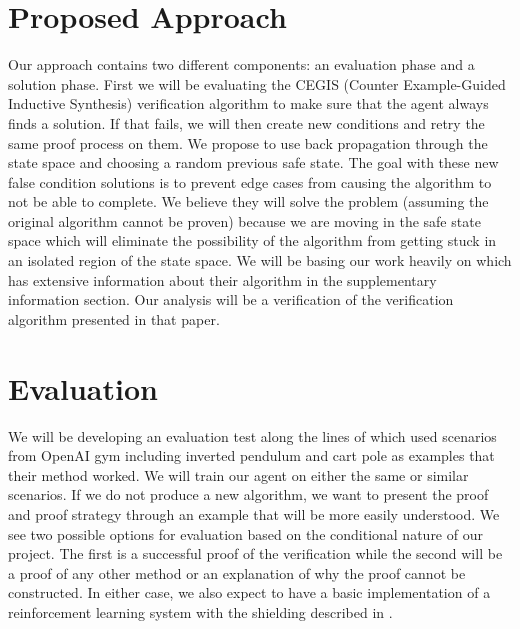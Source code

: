 \documentclass[11pt]{article}
\begin{document}

\section{Proposed Approach}
Our approach contains two different components: an evaluation phase and a solution phase. First we will be evaluating the CEGIS (Counter Example-Guided Inductive Synthesis) verification algorithm to make sure that the agent always finds a solution. If that fails, we will then create new conditions and retry the same proof process on them. We propose to use back propagation through the state space and choosing a random previous safe state. The goal with these new false condition solutions is to prevent edge cases from causing the algorithm to not be able to complete. We believe they will solve the problem (assuming the original algorithm cannot be proven) because we are moving in the safe state space which will eliminate the possibility of the algorithm from getting stuck in an isolated region of the state space. We will be basing our work heavily on \cite{zhu:2019} which has extensive information about their algorithm in the supplementary information section. Our analysis will be a verification of the verification algorithm presented in that paper. 

\section{Evaluation}
We will be developing an evaluation test along the lines of \cite{zhu:2019} which used scenarios from OpenAI gym including inverted pendulum and cart pole as examples that their method worked. We will train our agent on either the same or similar scenarios. If we do not produce a new algorithm, we want to present the proof and proof strategy through an example that will be more easily understood. We see two possible options for evaluation based on the conditional nature of our project. The first is a successful proof of the verification while the second will be a proof of any other method or an explanation of why the proof cannot be constructed. In either case, we also expect to have a basic implementation of a reinforcement learning system with the shielding described in \cite{zhu:2019}.  
\end{document}
